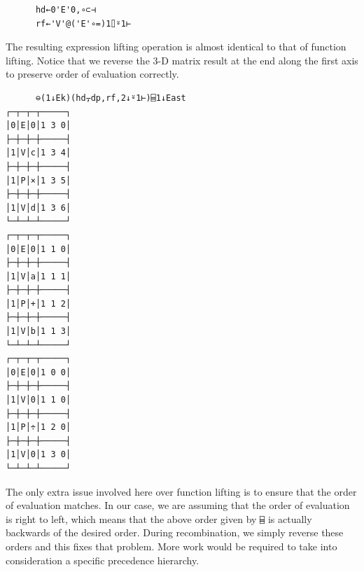 ﻿\documentclass[numbers,10pt,preprint]{sigplanconf}
\begin{document}
\begin{verbatim}
      hd←0'E'0,∘⊂⊣
      rf←'V'@('E'∘=)1⌷⍤1⊢
\end{verbatim}

\noindent The resulting expression lifting operation is almost identical to that of function lifting. Notice that we reverse the 3-D matrix result at the end along the first axis to preserve order of evaluation correctly. 

\begin{verbatim}
      ⊖(1↓Ek)(hd⍪dp,rf,2↓⍤1⊢)⌸1↓East
┌─┬─┬─┬─────┐
│0│E│0│1 3 0│
├─┼─┼─┼─────┤
│1│V│c│1 3 4│
├─┼─┼─┼─────┤
│1│P│×│1 3 5│
├─┼─┼─┼─────┤
│1│V│d│1 3 6│
└─┴─┴─┴─────┘
┌─┬─┬─┬─────┐
│0│E│0│1 1 0│
├─┼─┼─┼─────┤
│1│V│a│1 1 1│
├─┼─┼─┼─────┤
│1│P│+│1 1 2│
├─┼─┼─┼─────┤
│1│V│b│1 1 3│
└─┴─┴─┴─────┘
┌─┬─┬─┬─────┐
│0│E│0│1 0 0│
├─┼─┼─┼─────┤
│1│V│0│1 1 0│
├─┼─┼─┼─────┤
│1│P│÷│1 2 0│
├─┼─┼─┼─────┤
│1│V│0│1 3 0│
└─┴─┴─┴─────┘
\end{verbatim}

The only extra issue involved here over function lifting is to ensure that the order of evaluation matches. In our case, we are assuming that the order of evaluation is right to left, which means that the above order given by \verb;⌸; is actually backwards of the desired order. During recombination, we simply reverse these orders and this fixes that problem. More work would be required to take into consideration a specific precedence hierarchy.
\end{document}
